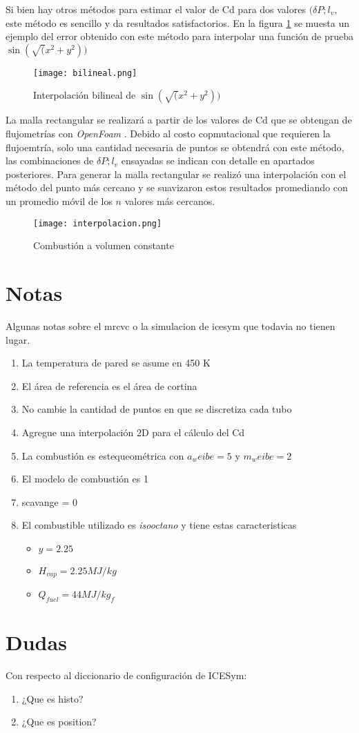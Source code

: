Si bien hay otros métodos para estimar el valor de Cd para dos valores $(\delta
P; l_v$, este método es sencillo y da resultados satisfactorios.
%
En la figura \ref{fig:bilineal} se muesta un ejemplo del error obtenido
con este método para interpolar una función de prueba 
$\sin(\sqrt(x^2 + y^2))$


\begin{figure}
    \centering
    \texttt{[image: bilineal.png]}
    \caption{Interpolación bilineal de $\sin(\sqrt(x^2 + y^2))$}
    \label{fig:bilineal}
\end{figure}

La malla rectangular se realizará a partir de los valores de Cd que se obtengan
de flujometrías con \emph{OpenFoam} \cite{openfoam}.
%
Debido al costo copmutacional que requieren la flujoemtría, solo una cantidad
necesaria de puntos se obtendrá con este método, las combinaciones de $\delta
P; l_v$ ensayadas se indican con detalle en apartados posteriores.
%
Para generar la malla rectangular se realizó una interpolación con el
método del punto más cercano y se suavizaron estos resultados promediando
con un promedio móvil de los $n$ valores más cercanos.

\begin{figure}
    \centering
    \texttt{[image: interpolacion.png]}
    \caption{Combustión a volumen constante}
    \label{fig:vol_constante}
\end{figure}


\section{Notas}
Algunas notas sobre el mrcvc o la simulacion de icesym que todavia no tienen
lugar.

\begin{enumerate}
    \item La temperatura de pared se asume en 450 K
    \item El área de referencia es el área de cortina
    \item No cambie la cantidad de puntos en que se discretiza cada tubo
    \item Agregue una interpolación 2D para el cálculo del Cd
    \item La combustión es estequeométrica con $a_weibe=5$ y $m_weibe=2$
    \item El modelo de combustión es 1
    \item scavange = 0
    \item El combustible utilizado es \emph{isooctano} y tiene estas
        caracteristicas 
        \begin{itemize}
            \item $y = 2.25$
            \item $H_{vap} = 2.25 MJ/kg$
            \item $Q_{fuel} = 44 MJ/kg_f$
        \end{itemize}
\end{enumerate}

\section{Dudas}
Con respecto al diccionario de configuración de ICESym:

\begin{enumerate}
    \item ¿Que es histo?
    \item ¿Que es position?
\end{enumerate}
